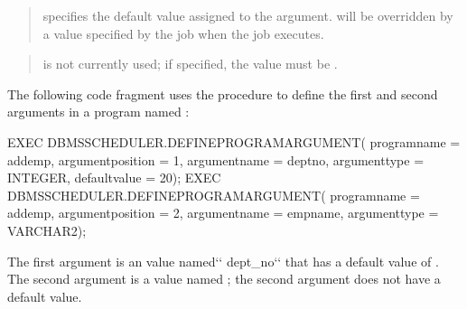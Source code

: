 \documentclass[letterpaper,10pt,english,openany,oneside]{sphinxmanual}
\begin{document}
\begin{quote}

 specifies the default value assigned to the
argument.  will be overridden by a value specified
by the job when the job executes.
\end{quote}

\begin{quote}

 is not currently used; if specified, the value must
be .
\end{quote}

\newpage


The following code fragment uses the  procedure
to define the first and second arguments in a program named :

%
\begin{sphinxVerbatim}[commandchars=\\\{\}]
EXEC
  DBMS\PYGZus{}SCHEDULER.DEFINE\PYGZus{}PROGRAM\PYGZus{}ARGUMENT(
    program\PYGZus{}name         =\PYGZgt{} \PYGZsq{}add\PYGZus{}emp\PYGZsq{},
    argument\PYGZus{}position    =\PYGZgt{} 1,
    argument\PYGZus{}name        =\PYGZgt{} \PYGZsq{}dept\PYGZus{}no\PYGZsq{},
    argument\PYGZus{}type        =\PYGZgt{} \PYGZsq{}INTEGER,
    default\PYGZus{}value        =\PYGZgt{} \PYGZsq{}20\PYGZsq{});
EXEC
  DBMS\PYGZus{}SCHEDULER.DEFINE\PYGZus{}PROGRAM\PYGZus{}ARGUMENT(
    program\PYGZus{}name         =\PYGZgt{} \PYGZsq{}add\PYGZus{}emp\PYGZsq{},
    argument\PYGZus{}position    =\PYGZgt{} 2,
    argument\PYGZus{}name        =\PYGZgt{} \PYGZsq{}emp\PYGZus{}name\PYGZsq{},
    argument\PYGZus{}type        =\PYGZgt{} \PYGZsq{}VARCHAR2\PYGZsq{});
\end{sphinxVerbatim}

The first argument is an  value named{}`{}` dept\_no{}`{}` that has a default
value of . The second argument is a  value named ;
the second argument does not have a default value.
\label{\detokenize{dbms_scheduler_disable:dbms-scheduler-disable}}
\newpage

\ignorespaces 
\end{document}
